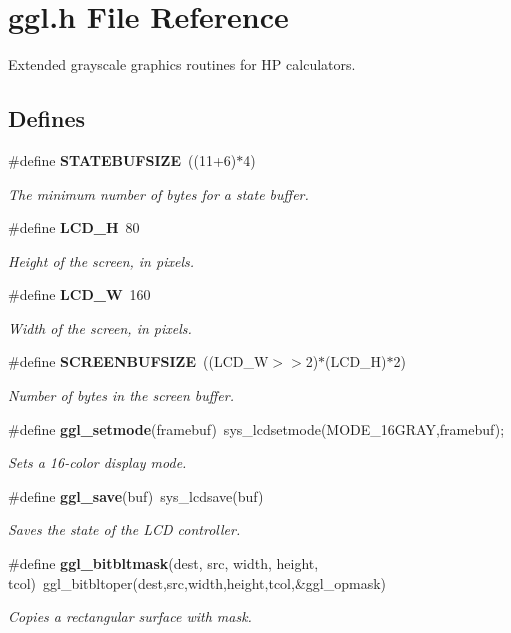 \section{ggl.h File Reference}
\label{ggl_8h}
Extended grayscale graphics routines for HP calculators. 

\subsection*{Defines}
\begin{CompactItemize}
\item 
\#define {\bf STATEBUFSIZE}~((11+6)$\ast$4)
\begin{CompactList}\small\item\em The minimum number of bytes for a state buffer. \item\end{CompactList}\item 
\#define {\bf LCD\_\-H}~80
\begin{CompactList}\small\item\em Height of the screen, in pixels. \item\end{CompactList}\item 
\#define {\bf LCD\_\-W}~160
\begin{CompactList}\small\item\em Width of the screen, in pixels. \item\end{CompactList}\item 
\#define {\bf SCREENBUFSIZE}~((LCD\_\-W$>$$>$2)$\ast$(LCD\_\-H)$\ast$2)
\begin{CompactList}\small\item\em Number of bytes in the screen buffer. \item\end{CompactList}\item 
\#define {\bf ggl\_\-setmode}(framebuf)~sys\_\-lcdsetmode(MODE\_\-16GRAY,framebuf);
\begin{CompactList}\small\item\em Sets a 16-color display mode. \item\end{CompactList}\item 
\#define {\bf ggl\_\-save}(buf)~sys\_\-lcdsave(buf)
\begin{CompactList}\small\item\em Saves the state of the LCD controller. \item\end{CompactList}\item 
\#define {\bf ggl\_\-bitbltmask}(dest, src, width, height, tcol)~ggl\_\-bitbltoper(dest,src,width,height,tcol,\&ggl\_\-opmask)
\begin{CompactList}\small\item\em Copies a rectangular surface with mask. \item\end{CompactList}\end{CompactItemize}
